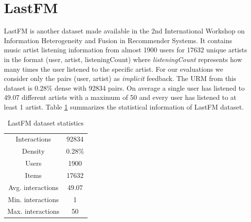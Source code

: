 \section{LastFM}
LastFM\cite{Cantador:RecSys2011} is another dataset made available in the 2nd International Workshop on Information Heterogeneity and Fusion in Recommender Systems. It contains music artist listening information from almost 1900 users for 17632 unique artists in the format (user, artist, listeningCount) where \emph{listeningCount} represents how many times the user listened to the specific artist. For our evaluations we consider only the pairs (user, artist) as \emph{implicit} feedback. The URM from this dataset is 0.28\% dense with 92834 pairs. On average a single user has listened to 49.07 different artists with a maximum of 50 and every user has listened to at least 1 artist. Table \ref{tab:lastfm_stats} summarizes the statistical information of LastFM dataset.

\begin{table}[h!]
    \centering
    \begin{tabular}{c|c}
        \hline
        Interactions & 92834 \\
        Density & 0.28\% \\
        Users & 1900 \\
        Items & 17632 \\
        Avg. interactions & 49.07 \\
        Min. interactions & 1 \\
        Max. interactions & 50 \\
        \hline
    \end{tabular}
    \caption{LastFM dataset statistics}
    \label{tab:lastfm_stats}
\end{table}

